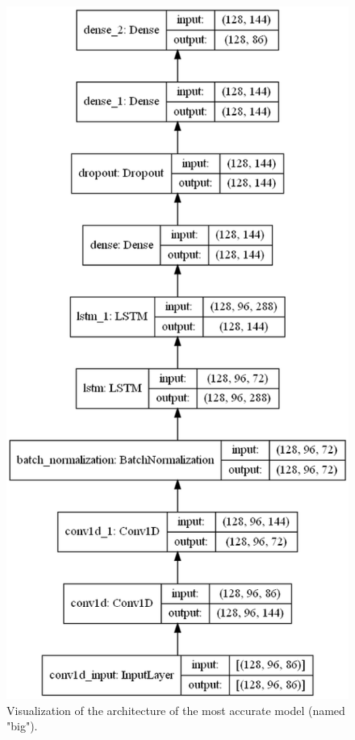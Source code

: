 \documentclass[11pt, twocolumn]{article}
\begin{document}
\begin{figure}[h]
    \centering
    \includegraphics[width=\linewidth]{images/big.png}
    \caption{Visualization of the architecture of the most accurate model (named "big").}
    \label{fig:arch}
\end{figure}
\end{document}
